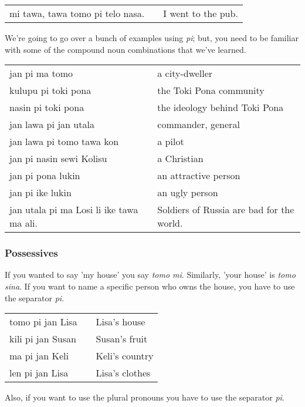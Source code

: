 \begin{supertabular}{p{5,5cm}|ll}
mi tawa, tawa tomo pi telo nasa. && I went to the pub. \\ 
\end{supertabular}  

We're going to go over a bunch of examples using \textit{pi}; but, you need to be familiar with some of the compound noun combinations that we've learned. 

\begin{supertabular}{p{5,5cm}|ll}
jan pi ma tomo && a city-dweller \\
kulupu pi toki pona && the Toki Pona community \\
nasin pi toki pona && the ideology behind Toki Pona \\
jan lawa pi jan utala && commander, general \\
jan lawa pi tomo tawa kon && a pilot \\
jan pi nasin sewi Kolisu && a Christian \\
jan pi pona lukin && an attractive person \\
jan pi ike lukin && an ugly person \\
jan utala pi ma Losi li ike tawa ma ali. && Soldiers of Russia are bad for the world. \\
\end{supertabular} 

%
\subsubsection*{Possessives} 
%
If you wanted to say 'my house' you say \textit{tomo mi}. 
Similarly, 'your house' is \textit{tomo sina}. 
If you want to name a specific person who owns the house, you have to use the separator \textit{pi}. 

\begin{supertabular}{p{5,5cm}|ll}
tomo pi jan Lisa && Lisa's house \\
kili pi jan Susan && Susan's fruit \\
ma pi jan Keli && Keli's country \\
len pi jan Lisa && Lisa's clothes \\
\end{supertabular}  

Also, if you want to use the plural pronouns you have to use the separator \textit{pi}.

